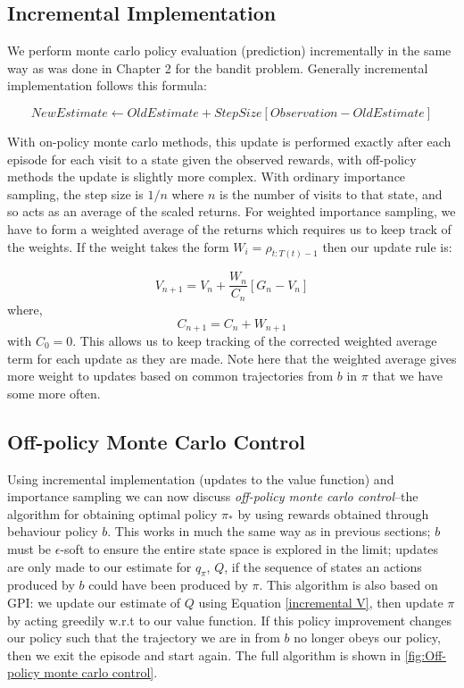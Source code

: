 \subsection{Incremental Implementation}
We perform monte carlo policy evaluation (prediction) incrementally in the same way as was done in Chapter 2 for the bandit problem. Generally incremental implementation follows this formula:

\begin{equation}
New Estimate \leftarrow Old Estimate + Step Size \left[Observation - Old Estimate \right]
\end{equation}

With on-policy monte carlo methods, this update is performed exactly after each episode for each visit to a state given the observed rewards, with off-policy methods the update is slightly more complex. With ordinary importance sampling, the step size is $1/n$ where $n$ is the number of visits to that state, and so acts as an average of the scaled returns. For weighted importance sampling, we have to form a weighted average of the returns which requires us to keep track of the weights. If the weight takes the form $W_i = \rho_{t:T(t)-1}$ then our update rule is:

\begin{equation} \label{incremental V}
V_{n+1} = V_n + \frac{W_n}{C_n}\left[G_n - V_n\right]
\end{equation}
where,
\begin{equation}
C_{n+1} = C_n + W_{n+1}
\end{equation}
with $C_0 = 0$. This allows us to keep tracking of the corrected weighted average term for each update as they are made. Note here that the weighted average gives more weight to updates based on common trajectories from $b$ in $\pi$ that we have some more often.

\subsection{Off-policy Monte Carlo Control}
Using incremental implementation (updates to the value function) and importance sampling we can now discuss \textit{off-policy monte carlo control}–the algorithm for obtaining optimal policy $\pi_*$ by using rewards obtained through behaviour policy $b$. This works in much the same way as in previous sections; $b$ must be $\epsilon$-soft to ensure the entire state space is explored in the limit; updates are only made to our estimate for $q_\pi$, $Q$, if the sequence of states an actions produced by $b$ could have been produced by $\pi$. This algorithm is also based on GPI: we update our estimate of $Q$ using Equation \ref*{incremental V}, then update $\pi$ by acting greedily w.r.t to our value function. If this policy improvement changes our policy such that the trajectory we are in from $b$ no longer obeys our policy, then we exit the episode and start again. The full algorithm is shown in \ref*{fig:Off-policy monte carlo control}.

